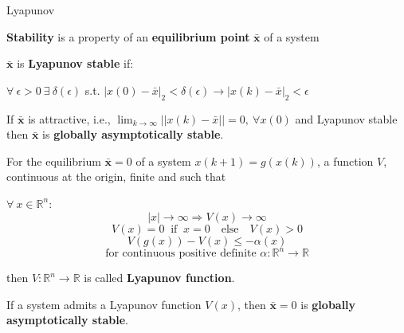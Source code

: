 
\begin{sstTitleBox}[Plum]{{
				\Large
				Lyapunov
			}\small
	}

	\begin{sstOnlyFrame}[Plum]
		\textbf{Stability} is a property of an
		\textbf{equilibrium point} $\bar{\mathbf{x}}$
		of a system
	\end{sstOnlyFrame}

	\begin{sstOnlyFrame}[Plum]
		\begin{definition}
			$\bar{\mathbf{x}}$ is \textbf{Lyapunov stable} if:

			$\forall\ \epsilon>0\ \exists\ \delta(\epsilon)$ s.t.
			$| x(0) - \bar{x} |_{\scriptscriptstyle 2}< \delta(\epsilon) \to
				| x(k) - \bar{x}|_{\scriptscriptstyle 2} < \epsilon$
		\end{definition}
	\end{sstOnlyFrame}

	\begin{sstOnlyFrame}[Plum]
		\begin{definition}
			If $\bar{\mathbf{x}}$ is attractive, i.e.,
			$\lim_{k\to\infty} ||x(k)-\bar{x}||=0,\ \forall x(0)$
			and Lyapunov stable
			then $\bar{\mathbf{x}}$ is \textbf{globally asymptotically stable}.
		\end{definition}
	\end{sstOnlyFrame}

	\begin{sstOnlyFrame}[Plum]
		\begin{definition}
			For the equilibrium $\bar{\mathbf{x}}=0$
			of a system $x(k+1)=g(x(k))$,
			a function $V$, continuous at the origin,
			finite and such that

			$\forall\ x\in \mathbb{R}^{n}$:
			\[
				|x|   \to\infty              \Rightarrow V(x)  \to\infty\]
			\[
				V(x)=0 \ \text{ if }\ x=0 \quad\text{else}\quad V(x)>0             \]
			\[
				V(g(x)) - V(x) \leq -\alpha(x)                          \]
			\[
				\text{for continuous positive definite }
				\alpha:\mathbb{R}^n\to \mathbb{R}
			\]

			then  $V:\mathbb{R}^n\to \mathbb{R}$
			is called \textbf{Lyapunov function}.
		\end{definition}
	\end{sstOnlyFrame}

	\begin{sstOnlyFrame}[Plum]
		\begin{theorem}
			If a system admits a Lyapunov function $V(x)$,
			then $\bar{\mathbf{x}} = 0$ is
			\textbf{globally asymptotically stable}.
		\end{theorem}
	\end{sstOnlyFrame}


\end{sstTitleBox}
